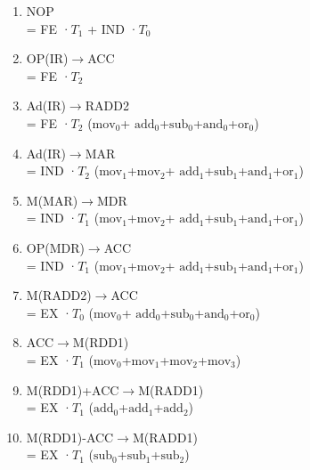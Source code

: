 \documentclass[UTF8]{ctexrep}
\begin{document}
\begin{enumerate}
\item NOP\\
= FE ·\(T_{1}\) + IND ·\(T_{0}\)\\

\item OP(IR)$\to$ACC\\
= FE ·\(T_{2}\)\\
\item Ad(IR)$\to$RADD2\\
= FE ·\(T_{2}\) ($\mathrm{mov_0}$+ $\mathrm{add_0}$+$\mathrm{sub_0}$+$\mathrm{and_0}$+$\mathrm{or_0}$)\\

\item Ad(IR)$\to$MAR\\
= IND ·\(T_{2}\) ($\mathrm{mov_1}$+$\mathrm{mov_2}$+ $\mathrm{add_1}$+$\mathrm{sub_1}$+$\mathrm{and_1}$+$\mathrm{or_1}$)\\

\item M(MAR)$\to$MDR\\
= IND ·\(T_{1}\) ($\mathrm{mov_1}$+$\mathrm{mov_2}$+ $\mathrm{add_1}$+$\mathrm{sub_1}$+$\mathrm{and_1}$+$\mathrm{or_1}$)\\

\item OP(MDR)$\to$ACC\\
= IND ·\(T_{1}\) ($\mathrm{mov_1}$+$\mathrm{mov_2}$+ $\mathrm{add_1}$+$\mathrm{sub_1}$+$\mathrm{and_1}$+$\mathrm{or_1}$)\\

\item M(RADD2)$\to$ACC\\
= EX ·\(T_{0}\) ($\mathrm{mov_0}$+ $\mathrm{add_0}$+$\mathrm{sub_0}$+$\mathrm{and_0}$+$\mathrm{or_0}$)\\

\item ACC$\to$M(RDD1)\\
= EX ·\(T_{1}\) ($\mathrm{mov_0}$+$\mathrm{mov_1}$+$\mathrm{mov_2}$+$\mathrm{mov_3}$)\\

\item M(RDD1)+ACC$\to$M(RADD1)\\
= EX ·\(T_{1}\) ($\mathrm{add_0}$+$\mathrm{add_1}$+$\mathrm{add_2}$)\\

\item M(RDD1)-ACC$\to$M(RADD1)\\
= EX ·\(T_{1}\) ($\mathrm{sub_0}$+$\mathrm{sub_1}$+$\mathrm{sub_2}$)\\


\end{enumerate}
\end{document}
